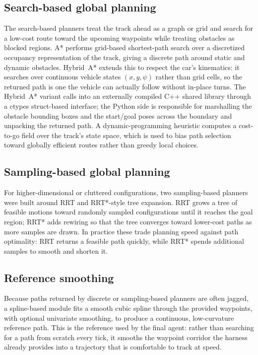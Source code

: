 \documentclass[conference]{IEEEtran}
\begin{document}
\subsection{Search-based global planning}

The search-based planners treat the track ahead as a graph or grid and search
for a low-cost route toward the upcoming waypoints while treating obstacles as
blocked regions. A* performs grid-based shortest-path search over a discretized
occupancy representation of the track, giving a discrete path around static and
dynamic obstacles. Hybrid~A* extends this to respect the car's kinematics: it
searches over continuous vehicle states $(x, y, \psi)$ rather than grid cells,
so the returned path is one the vehicle can actually follow without in-place
turns. The Hybrid~A* variant calls into an externally compiled C++ shared
library through a ctypes struct-based interface; the Python side is responsible
for marshalling the obstacle bounding boxes and the start/goal poses across the
boundary and unpacking the returned path. A dynamic-programming heuristic
computes a cost-to-go field over the track's state space, which is used to bias
path selection toward globally efficient routes rather than greedy local
choices.

\subsection{Sampling-based global planning}

For higher-dimensional or cluttered configurations, two sampling-based planners
were built around RRT and RRT*-style tree expansion. RRT grows a tree of
feasible motions toward randomly sampled configurations until it reaches the
goal region; RRT* adds rewiring so that the tree converges toward lower-cost
paths as more samples are drawn. In practice these trade planning speed against
path optimality: RRT returns a feasible path quickly, while RRT* spends
additional samples to smooth and shorten it.

\subsection{Reference smoothing}

Because paths returned by discrete or sampling-based planners are often jagged,
a spline-based module fits a smooth cubic spline through the provided waypoints,
with optional univariate smoothing, to produce a continuous, low-curvature
reference path. This is the reference used by the final agent: rather than
searching for a path from scratch every tick, it smooths the waypoint corridor
the harness already provides into a trajectory that is comfortable to track at
speed.
\end{document}
